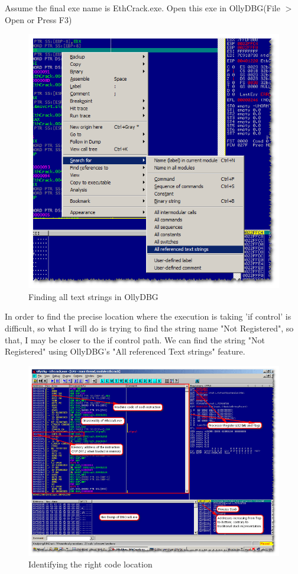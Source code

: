 \documentclass{article}
\begin{document}
Assume the final exe name is EthCrack.exe. Open this exe in OllyDBG(File $>$ Open or Press F3)
\begin{figure}[H]
\centering
\includegraphics[width=\textwidth]{EthicalCracking1.png}
\caption{Finding all text strings  in OllyDBG}
\end{figure}
In order to find the precise location where the execution is taking 'if control' is difficult, so what I will do is trying to find the string name "Not Registered", so that, I may be closer to the if control path. We can find the string "Not Registered" using OllyDBG's "All referenced Text strings" feature.
\begin{figure}[H]
\centering
\includegraphics[width=\textwidth]{EthicalCracking2.png}
\caption{Identifying the right code location}
\end{figure}
\end{document}
